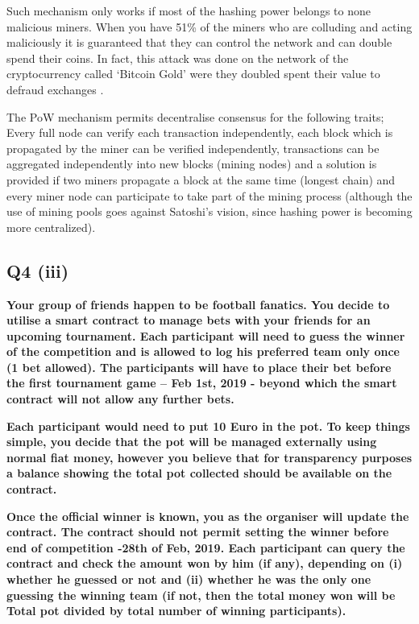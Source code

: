 \noindent
Such mechanism only works if most of the hashing power belongs to none malicious miners. When you have 51\% of the miners who are colluding and acting maliciously it is guaranteed that they can control the network and can double spend their coins. In fact, this attack was done on the network of the cryptocurrency called ‘Bitcoin Gold’ were they doubled spent their value to defraud exchanges \cite{51attack}.  

\noindent
The PoW mechanism permits decentralise consensus for the following traits; Every full node can verify each transaction independently, each block which is propagated by the miner can be verified independently, transactions can be aggregated independently into new blocks (mining nodes) and a solution is provided if two miners propagate a block at the same time (longest chain) and every miner node can participate to take part of the mining process (although the use of mining pools goes against Satoshi’s vision, since hashing power is becoming more centralized). 


\subsection{Q4 (iii)}\label{sssec:pt2q4iii}
\textbf{Your group of friends happen to be football fanatics. You decide to utilise a smart contract to manage bets with your friends for an upcoming tournament. Each participant will need to guess the winner of the competition and is allowed to log his preferred team only once (1 bet allowed). The participants will have to place their bet before the first tournament game – Feb 1st, 2019 - beyond which the smart contract will not allow any further bets.}

\noindent
\textbf{Each participant would need to put 10 Euro in the pot. To keep things simple, you decide that the pot will be managed externally using normal fiat money, however you believe that for transparency purposes a balance showing the total pot collected should be available on the contract.}

\noindent
\textbf{Once the official winner is known, you as the organiser will update the contract. The contract should not permit setting the winner before end of competition -28th of Feb, 2019. Each participant can query the contract and check the amount won by him (if any), depending on (i) whether he guessed or not and (ii) whether he was the only one guessing the winning team (if not, then the total money won will be Total pot divided by total number of winning participants).}

